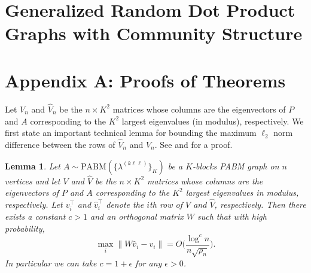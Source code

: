 \documentclass[
  11pt,
]{article}
\newtheorem{lemma}{Lemma}[section]
\theoremstyle{definition}
\theoremstyle{definition}
\theoremstyle{definition}
\theoremstyle{definition}
\theoremstyle{remark}
\begin{document}
\newpage

\hypertarget{generalized-random-dot-product-graphs-with-community-structure}{%
\section{Generalized Random Dot Product Graphs with Community Structure}\label{generalized-random-dot-product-graphs-with-community-structure}}

\newpage

\section*{Appendix A: Proofs of Theorems}

Let \(V_n\) and \(\hat{V}_n\)
be the \(n \times K^2\) matrices whose columns are the eigenvectors of \(P\) and \(A\) corresponding to the
\(K^2\) largest eigenvalues (in modulus), respectively.
We first state an important technical lemma for bounding the maximum
\(\ell_2\) norm difference between the rows of \(\hat{V}_n\) and
\(V_n\). See \citet{cape_biometrika} and
\citet[Lemma~5]{rubindelanchy2017statistical} for a proof.

\begin{lemma}
\label{lem:technical}
Let $A \sim \mathrm{PABM}(\{\lambda^{(k \ell \ell)}\}_{K})$ be a $K$-blocks
PABM graph on $n$ vertices and let \(V\) and \(\hat{V}\)
be the $n \times K^2$ matrices whose columns are the eigenvectors of 
\(P\) and \(A\) corresponding to the
$K^2$ largest eigenvalues in modulus, respectively.
Let \(v_i^\top\) and \(\hat{v}_i^\top\) denote the $i$th 
row of \(V\) and \(\hat{V}\), respectively. 
Then there exists a constant $c > 1$ and an orthogonal matrix $W$ such
that with high probability,
$$\max_{i} \|W \hat{v}_i - v_i\|  = O\Big(\frac{\log^{c}n}{n \sqrt{\rho_n}} \Big).$$
In particular we can take $c = 1 + \epsilon$ for any $\epsilon > 0$. 
\end{lemma}
\end{document}
